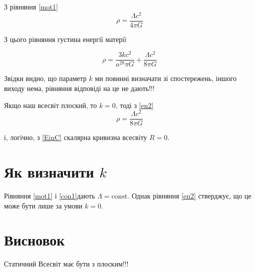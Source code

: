 \documentclass[14pt]{extarticle}
\begin{document}
З рівняння \eqref{mot1}
\begin{equation}\label{key}
	\rho = \frac{\Lambda c^2}{4\pi G}
\end{equation}

З цього рівняння густина енергії матерії

\begin{equation}\label{en2}
\rho =\frac{3kc^2}{a^28\pi G} + \frac{\Lambda c^2}{8\pi G}
\end{equation}

Звідки видно, що параметр $k$ ми повинні визначати зі спостережень, іншого виходу нема, рівняння відповіді на це не дають!!!

Якщо наш всесвіт плоский, то $k = 0$, тоді з \eqref{en2}
\begin{equation}\label{en3}
		\rho =\frac{\Lambda c^2}{8\pi G}
\end{equation}

і, логічно, з \eqref{EinC} скалярна кривизна всесвіту $R = 0$.

%

\section*{Як визначити $k$}

Рівняння \eqref{mot1} і \eqref{con1}дають  $\Lambda = \mathrm{const}$. Однак рівняння \eqref{en2} стверджує, що це може бути лише за умови $k = 0$.

\section*{Висновок}

Статичний Всесвіт має бути з плоским!!!
\end{document}
